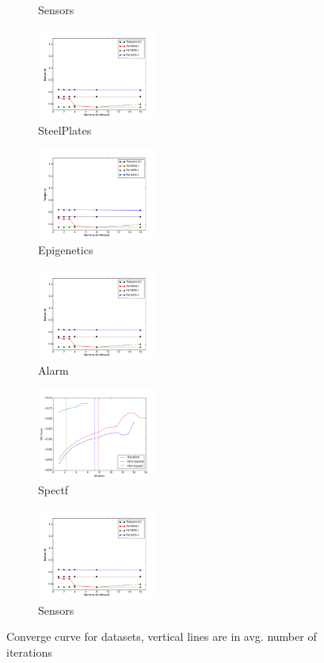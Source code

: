 \begin{figure}[H]
\begin{subfigure}{.24\textwidth}
		\caption{Sensors}
		\label{fig:sensors}
	\end{subfigure}
	\begin{subfigure}{.24\textwidth}
		\centering
		\includegraphics[height=3cm]{images/steelPlates}
		\caption{SteelPlates}
		\label{fig:steelplates}
	\end{subfigure}
	\begin{subfigure}{.24\textwidth}
		\centering
		\includegraphics[height=3cm]{images/epigenetics}
		\caption{Epigenetics}
		\label{fig:epigenetics}
	\end{subfigure}
	\begin{subfigure}{.24\textwidth}
		\centering
		\includegraphics[height=3cm]{images/alarm}
		\caption{Alarm}
		\label{fig:alarm}
	\end{subfigure}
	\begin{subfigure}{.24\textwidth}
		\centering
		\includegraphics[height=3cm]{images/spectf}
		\caption{Spectf}
		\label{fig:spectf}
	\end{subfigure}
	\begin{subfigure}{.24\textwidth}
		\centering
		\includegraphics[height=3cm]{images/sensors}
		\caption{Sensors}
		\label{fig:sensors}
	\end{subfigure}
 	\caption{Converge curve for datasets, vertical lines are in avg. number of iterations}
 	\label{fig:converge}
 \end{figure}